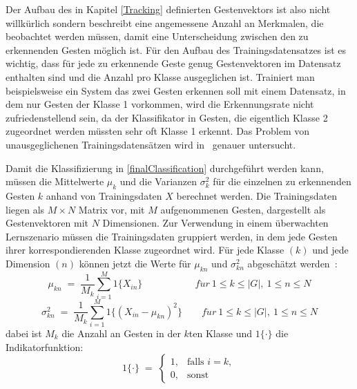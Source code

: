 Der Aufbau des in Kapitel \ref{Tracking} definierten Gestenvektors ist also nicht willkürlich sondern beschreibt eine angemessene Anzahl an Merkmalen, die beobachtet werden müssen, damit eine Unterscheidung zwischen den zu erkennenden Gesten möglich ist. Für den Aufbau des Trainingsdatensatzes ist es wichtig, dass für jede zu erkennende Geste genug Gestenvektoren im Datensatz enthalten sind und die Anzahl pro Klasse ausgeglichen ist. Trainiert man beispielsweise ein System das zwei Gesten erkennen soll mit einem Datensatz, in dem nur Gesten der Klasse 1 vorkommen, wird die Erkennungsrate nicht zufriedenstellend sein, da der Klassifikator in Gesten, die eigentlich Klasse 2 zugeordnet werden müssten sehr oft Klasse 1 erkennt. Das Problem von unausgeglichenen Trainingsdatensätzen wird in~\cite{unbalancedSamples} genauer untersucht. 

Damit die Klassifizierung in \eqref{finalClassification} durchgeführt werden kann, müssen die Mittelwerte $\mu_k$ und die Varianzen $\sigma^2_k$ für die einzelnen zu erkennenden Gesten $k$ anhand von Trainingsdaten $X$ berechnet werden. Die Trainingsdaten liegen als $M\times N$ Matrix vor, mit $M$ aufgenommenen Gesten, dargestellt als Gestenvektoren mit $N$ Dimensionen. Zur Verwendung in einem überwachten Lernszenario müssen die Trainingsdaten gruppiert werden, in dem jede Gesten ihrer korrespondierenden Klasse zugeordnet wird. Für jede Klasse $(k)$ und jede Dimension $(n)$ können jetzt die Werte für $\mu_{kn}$ und $\sigma^2_{kn}$ abgeschätzt werden~\cite{gillianANBC}:
\begin{equation}
    \mu_{kn} \; = \; \frac{1}{M_k} \sum_{i=1}^M 1{\{X_{in}}\} \qquad \qquad \quad \ \ 
    f\ddot{u}r \ 1\leq k \leq |G|,\ 1\leq n\leq N
\end{equation}
\begin{equation}
    \sigma_{kn}^2 \; = \; \frac{1}{M_k} \sum_{i=1}^M 1{\{(X_{in} - \mu_{kn})^2}\} \qquad 
    f\ddot{u}r \ 1\leq k \leq |G|,\ 1\leq n\leq N
\end{equation}
dabei ist $M_k$ die Anzahl an Gesten in der $k$ten Klasse und $1\{\cdot\}$ die Indikatorfunktion:
\begin{equation}
    1\{\cdot\} \; = \; \begin{cases}
                            1,&{\text{falls }}i=k,\\0,&{\text{sonst}}
                       \end{cases}
\end{equation}
 